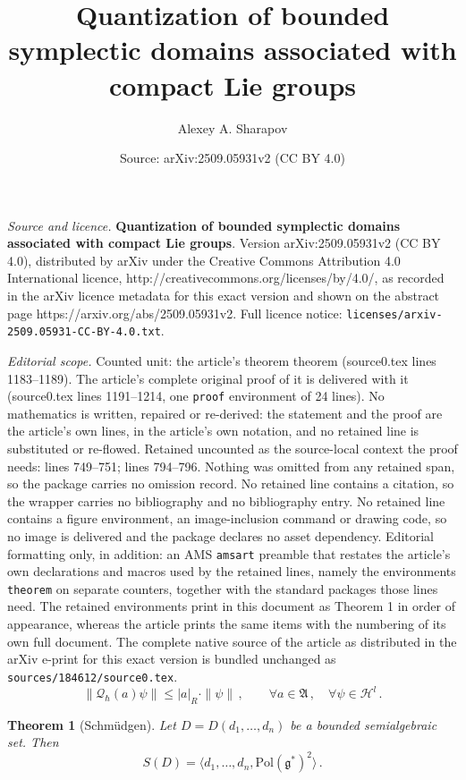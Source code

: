 \documentclass[10pt,a4paper]{amsart}
\title{{\bf Quantization of bounded symplectic domains associated with compact Lie groups}}
\author{Alexey A. Sharapov}
\date{Source: arXiv:2509.05931v2 (CC BY 4.0)}
\newtheorem{theorem}{Theorem}
\newcommand{\fa}{\mathfrak{A}}
\newcommand{\hh}{\mathcal{H}}
\newcommand{\pol}{\mathrm{Pol}(\mathfrak{g}^\ast )}
\newcommand{\qq}{\mathcal{Q}_{\hbar}}
\begin{document}
\maketitle

\noindent\emph{Source and licence.} {\bf Quantization of bounded symplectic domains associated with compact Lie groups}. Version arXiv:2509.05931v2 (CC BY 4.0), distributed by arXiv under the Creative Commons Attribution 4.0 International licence, http://creativecommons.org/licenses/by/4.0/, as recorded in the arXiv licence metadata for this exact version and shown on the abstract page https://arxiv.org/abs/2509.05931v2. Full licence notice: \texttt{licenses/arxiv-2509.05931-CC-BY-4.0.txt}.\par\smallskip

\noindent\textit{Editorial scope.} Counted unit: the article's theorem theorem (source0.tex lines 1183--1189). The article's complete original proof of it is delivered with it (source0.tex lines 1191--1214, one \texttt{proof} environment of 24 lines). No mathematics is written, repaired or re-derived: the statement and the proof are the article's own lines, in the article's own notation, and no retained line is substituted or re-flowed.  Retained uncounted as the source-local context the proof needs: lines 749--751; lines 794--796.  Nothing was omitted from any retained span, so the package carries no omission record.  No retained line contains a citation, so the wrapper carries no bibliography and no bibliography entry.  No retained line contains a figure environment, an image-inclusion command or drawing code, so no image is delivered and the package declares no asset dependency.  Editorial formatting only, in addition: an AMS \texttt{amsart} preamble that restates the article's own declarations and macros used by the retained lines, namely the environments \texttt{theorem} on separate counters, together with the standard packages those lines need.  The retained environments print in this document as Theorem 1 in order of appearance, whereas the article prints the same items with the numbering of its own full document.  The complete native source of the article as distributed in the arXiv e-print for this exact version is bundled unchanged as \texttt{sources/184612/source0.tex}.
\begin{equation}\label{QR}
\|\qq(a)\psi \|\leq |a|_{R} \cdot\|\psi\|\,,\qquad \forall a\in \fa\,, \quad \forall \psi\in \hh^l\,.
\end{equation}

\begin{theorem}[Schm\"udgen]  \label{T1}
    Let $D=D(d_1,\ldots, d_n)$ be a bounded semialgebraic set. Then $$ S(D)=\langle d_1,\ldots, d_n, \pol^2 \rangle\,.$$ 
\end{theorem}
\end{document}
